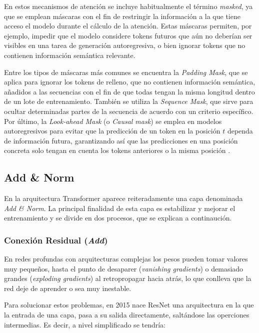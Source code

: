 \documentclass[11pt]{book}
\theoremstyle{plain}
\theoremstyle{definition}
\begin{document}
En estos mecanismos de atención se incluye habitualmente el término \textit{masked}, ya que se emplean máscaras con el fin de restringir la información a la que tiene acceso el modelo durante el cálculo de la atención. Estas máscaras permiten, por ejemplo, impedir que el modelo considere tokens futuros que aún no deberían ser visibles en una tarea de generación autoregresiva, o bien ignorar tokens que no contienen información semántica relevante. 

Entre los tipos de máscaras más comunes se encuentra la \textit{Padding Mask}, que se aplica para ignorar los tokens de relleno, que no contienen información semántica, añadidos a las secuencias con el fin de que todas tengan la misma longitud dentro de un lote de entrenamiento. También se utiliza la \textit{Sequence Mask}, que sirve para ocultar determinadas partes de la secuencia de acuerdo con un criterio específico. Por último, la \textit{Look-ahead Mask} (o \textit{Causal mask}) se emplea en modelos autoregresivos para evitar que la predicción de un token en la posición $t$ dependa de información futura, garantizando así que las predicciones en una posición concreta solo tengan en cuenta los tokens anteriores o la misma posición \parencite{swarms_masking_pytorch}.


\subsection{Add \& Norm \parencite{sharma2024addnorm}} \label{subsec:addnorm}

En la arquitectura Transformer aparece reiteradamente una capa denominada \textit{Add \& Norm}. La principal finalidad de esta capa es estabilizar y mejorar el entrenamiento y se divide en dos procesos, que se explican a continaución.
\subsubsection{Conexión Residual (\textit{Add})}
En redes profundas con arquitecturas complejas los pesos pueden tomar valores muy pequeños, hasta el punto de desaparer (\textit{vanishing gradients}) o demasiado grandes (\textit{exploding gradients}) al retropropagar hacia atrás, lo que conlleva que la red deje de aprender o sea muy inestable. 

Para solucionar estos problemas, en 2015 nace ResNet una arquitectura en la que la entrada de una capa, pasa a su salida directamente, saltándose las operciones intermedias. Es decir, a nivel simplificado se tendría: 
\end{document}
